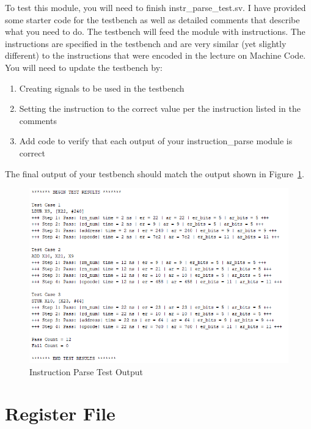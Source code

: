 To test this module, you will need to finish instr\_parse\_test.sv.  I have provided some starter code for the testbench as well as detailed comments that describe what you need to do.  The testbench will feed the module with instructions.  The instructions are specified in the testbench and are very similar (yet slightly different) to the instructions that were encoded in the lecture on Machine Code.  You will need to update the testbench by:

\begin{enumerate}
	\item Creating signals to be used in the testbench
	\item Setting the instruction to the correct value per the instruction listed in the comments
	\item Add code to verify that each output of your instruction\_parse module is correct
\end{enumerate}

The final output of your testbench should match the output shown in Figure~\ref{fig:instr_parse_test_output}.

\begin{figure}
	\caption{Instruction Parse Test Output}\label{fig:instr_parse_test_output}
	\begin{center}
		\includegraphics[width=4.75in]{../images/instr_parse_test_output.png}
	\end{center}
\end{figure}

\section{Register File}

